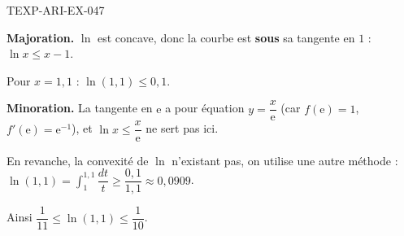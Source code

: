 \begin{corrige}{TEXP-ARI-EX-047}

\textbf{Majoration.} $\ln$ est concave, donc la courbe est \textbf{sous} sa tangente en $1$ : $\ln x \leq x - 1$.


Pour $x = 1{,}1$ : $\ln(1{,}1) \leq 0{,}1$.

\textbf{Minoration.} La tangente en $\mathrm{e}$ a pour équation $y = \dfrac{x}{\mathrm{e}}$ (car $f(\mathrm{e})=1$, $f'(\mathrm{e})=\mathrm{e}^{-1}$), et $\ln x \leq \dfrac{x}{\mathrm{e}}$ ne sert pas ici.

En revanche, la convexité de $\ln$ n'existant pas, on utilise une autre méthode : $\ln(1{,}1) = \int_1^{1{,}1} \dfrac{dt}{t} \geq \dfrac{0{,}1}{1{,}1} \approx 0{,}0909$.

Ainsi $\dfrac{1}{11} \leq \ln(1{,}1) \leq \dfrac{1}{10}$.

\end{corrige}
